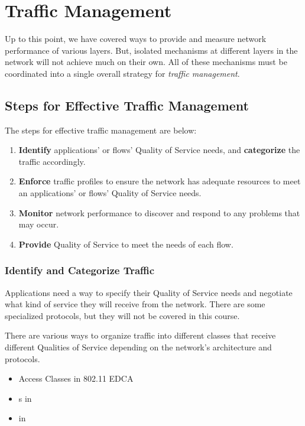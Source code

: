 \section{Traffic Management}\label{sec:Traffic_Management}
Up to this point, we have covered ways to provide and measure network performance of various layers.
But, isolated mechanisms at different layers in the network will not achieve much on their own.
All of these mechanisms must be coordinated into a single overall strategy for \emph{traffic management}.

\subsection{Steps for Effective Traffic Management}\label{subsec:Steps_Effective_Traffic_Management}
The steps for effective traffic management are below:
\begin{enumerate}[noitemsep]
\item \textbf{Identify} applications' or flows' Quality of Service needs, and \textbf{categorize} the traffic accordingly.
\item \textbf{Enforce} traffic profiles to ensure the network has adequate resources to meet an applications' or flows' Quality of Service needs.
\item \textbf{Monitor} network performance to discover and respond to any problems that may occur.
\item \textbf{Provide} Quality of Service to meet the needs of each flow.
\end{enumerate}

\subsubsection{Identify and Categorize Traffic}\label{subsubsec:Identify_Categorize_Traffic}
Applications need a way to specify their Quality of Service needs and negotiate what kind of service they will receive from the network.
There are some specialized protocols, but they will not be covered in this course.

There are various ways to organize traffic into different classes that receive different Qualities of Service depending on the network's architecture and protocols.
\begin{itemize}[noitemsep]
\item Access Classes in 802.11 EDCA
\item {}s in 
\item {} in 
\end{itemize}






